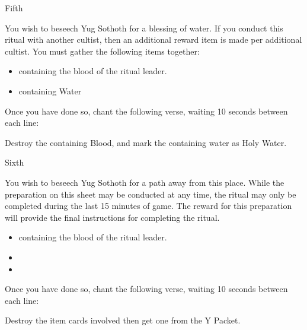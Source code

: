 \documentclass[greennotebook]{guildcamp4} %
\begin{document}
\begin{page}{Fifth}
	
		You wish to beseech Yug Sothoth for a blessing of water. If you conduct this ritual with another cultist, then an additional reward item is made per additional cultist. You must gather the following items together: 
		
		\begin{itemize}
			\item \iTestTube{} containing the blood of the ritual leader.
			\item \iTestTube{} containing Water
		\end{itemize}
		
		Once you have done so, chant the following verse, waiting 10 seconds between each line:
		
		
		Destroy the \iTestTube{} containing Blood, and mark the \iTestTube{} containing water as Holy Water.
		
	
\end{page}

\begin{page}{Sixth}
	

	You wish to beseech Yug Sothoth for a path away from this place. While the preparation on this sheet may be conducted at any time, the ritual may only be completed during the last 15 minutes of game. The reward for this preparation will provide the final instructions for completing the ritual.
		
	\begin{itemize}
			\item \iTestTube{} containing the blood of the ritual leader.
			\item \iGlassLens{}
			\item \iScrapMetal{}
	\end{itemize}
	
	Once you have done so, chant the following verse, waiting 10 seconds between each line:
		
	
	Destroy the item cards involved then get one \aOpenWay{} from the Y Packet.
	
	
\end{page}


\endnotebook
\end{document}
